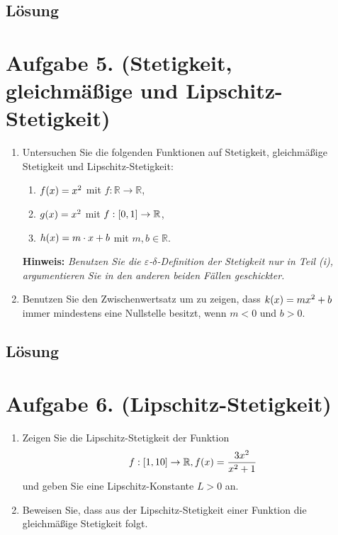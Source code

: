 \documentclass[german,12pt]{homework}
\newcommand{\RR}{\mathbb{R}}
\DeclarePairedDelimiter{\enbrace}{(}{)}
\DeclarePairedDelimiter{\benbrace}{[}{]}
\begin{document}
    \subsection*{Lösung} \clearpage

    \section*{Aufgabe 5. (Stetigkeit, gleichmäßige und Lipschitz-Stetigkeit)}

    \begin{problem}
        \begin{enumerate}
            \item Untersuchen Sie die folgenden Funktionen auf Stetigkeit, gleichmäßige Stetigkeit und Lipschitz-Stetigkeit:
            \begin{enumerate}[label=\roman*)]
                \item \(f\enbrace*{x} = x^2\) mit \(f: \RR \to \RR\),
                \item \(g\enbrace*{x} = x^2\) mit \(f: \benbrace*{0, 1} \to \RR\),
                \item \(h\enbrace*{x} = m \cdot x + b\) mit \(m, b \in \RR\).
            \end{enumerate}
            \textbf{Hinweis:} \emph{Benutzen Sie die \(\varepsilon\)-\(\delta\)-Definition der Stetigkeit nur in Teil (i), argumentieren Sie in den anderen beiden Fällen geschickter.}
            \item Benutzen Sie den Zwischenwertsatz um zu zeigen, dass \(k\enbrace*{x} = mx^2 + b\) immer mindestens eine Nullstelle besitzt, wenn \(m < 0\) und \(b > 0\).
        \end{enumerate}
    \end{problem}

    \subsection*{Lösung} \clearpage

    \section*{Aufgabe 6. (Lipschitz-Stetigkeit)}

    \begin{problem}
        \begin{enumerate}
            \item Zeigen Sie die Lipschitz-Stetigkeit der Funktion
            \[f: \benbrace*{1, 10} \to \RR, f\enbrace*{x} = \frac{3x^2}{x^2 + 1}\]
            und geben Sie eine Lipschitz-Konstante \(L > 0\) an.
            \item Beweisen Sie, dass aus der Lipschitz-Stetigkeit einer Funktion
            die gleichmäßige Stetigkeit folgt.
        \end{enumerate}
    \end{problem}
\end{document}
